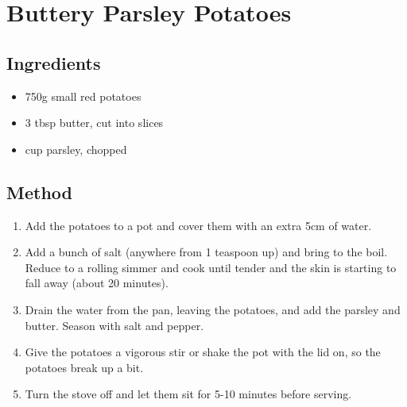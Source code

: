 \section{Buttery Parsley Potatoes}
\begin{multicols}{2}
  \subsection{Ingredients}
    \begin{itemize}
      \item 750g small red potatoes
      \item 3 tbsp butter, cut into slices
      \item {} cup parsley, chopped
    \end{itemize}
  \vfill\null
  \columnbreak
  \subsection{Method}
    \begin{enumerate}
      \item Add the potatoes to a pot and cover them with an extra 5cm of water.
      \item Add a bunch of salt (anywhere from 1 teaspoon up) and bring to the boil. Reduce to a rolling simmer and cook until tender and the skin is starting to fall away (about 20 minutes).
      \item Drain the water from the pan, leaving the potatoes, and add the parsley and butter. Season with salt and pepper.
      \item Give the potatoes a vigorous stir or shake the pot with the lid on, so the potatoes break up a bit.
      \item Turn the stove off and let them sit for 5-10 minutes before serving.
    \end{enumerate}
  \end{multicols}
